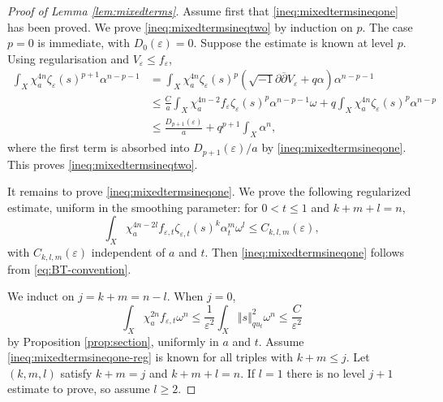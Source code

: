 \documentclass[11pt]{amsart}
\numberwithin{equation}{section}
\newcommand{\vep}{\varepsilon}
\renewcommand{\d}{\partial}
\newcommand{\ddbar}{\sqrt{-1}\d\overline{\d}}
\theoremstyle{plain}
\theoremstyle{remark}
\begin{document}
\begin{proof}[Proof of Lemma \ref{lem:mixedterms}]
Assume first that \eqref{ineq:mixedtermsineqone} has been proved.  We prove \eqref{ineq:mixedtermsineqtwo} by induction on $p$.  The case $p=0$ is immediate, with $D_0(\vep)=0$.  Suppose the estimate is known at level $p$.  Using regularisation and $V_\vep\leq f_\vep$,
\begin{align*}
\int_X\chi_a^{4n}\zeta_\vep(s)^{p+1}\alpha^{n-p-1}
&=\int_X\chi_a^{4n}\zeta_\vep(s)^p(\ddbar V_\vep+q\alpha)\alpha^{n-p-1}\\
&\leq \frac{C}{a}\int_X\chi_a^{4n-2}f_\vep\zeta_\vep(s)^p\alpha^{n-p-1}\omega
+q\int_X\chi_a^{4n}\zeta_\vep(s)^p\alpha^{n-p}\\
&\leq \frac{D_{p+1}(\vep)}{a}+q^{p+1}\int_X\alpha^n,
\end{align*}
where the first term is absorbed into $D_{p+1}(\vep)/a$ by \eqref{ineq:mixedtermsineqone}.  This proves \eqref{ineq:mixedtermsineqtwo}.

It remains to prove \eqref{ineq:mixedtermsineqone}.  We prove the following regularized estimate, uniform in the smoothing parameter: for $0<t\le1$ and $k+m+l=n$,
\begin{equation}\label{ineq:mixedtermsineqone-reg}
\int_X\chi_a^{4n-2l}f_{\vep,t}\zeta_{\vep,t}(s)^k\alpha_t^m\omega^l
\leq C_{k,l,m}(\vep),
\end{equation}
with $C_{k,l,m}(\vep)$ independent of $a$ and $t$.  Then \eqref{ineq:mixedtermsineqone} follows from \eqref{eq:BT-convention}.

We induct on $j=k+m=n-l$.  When $j=0$,
\[
\int_X\chi_a^{2n}f_{\vep,t}\omega^n
\leq \frac1{\vep^2}\int_X\Vert s\Vert_{q u_t}^2\omega^n
\leq \frac{C}{\vep^2}
\]
by Proposition \ref{prop:section}, uniformly in $a$ and $t$.
Assume \eqref{ineq:mixedtermsineqone-reg} is known for all triples with $k+m\leq j$.  Let $(k,m,l)$ satisfy $k+m=j$ and $k+m+l=n$.  If $l=1$ there is no level $j+1$ estimate to prove, so assume $l\ge2$.


\end{proof}
\end{document}
